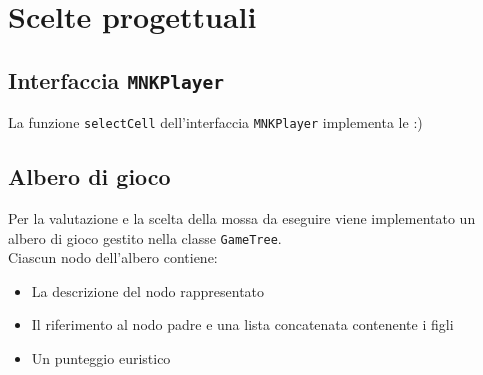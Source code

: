 \documentclass[11pt]{article}
\begin{document}
\section{Scelte progettuali}
\subsection{Interfaccia \texttt{MNKPlayer}}
La funzione \texttt{selectCell} dell'interfaccia \texttt{MNKPlayer} implementa le :)
\subsection{Albero di gioco}
Per la valutazione e la scelta della mossa da eseguire viene implementato un albero di gioco gestito nella classe \texttt{GameTree}.\\
Ciascun nodo dell'albero contiene:
\begin{itemize}		%
	\item La descrizione del nodo rappresentato
	\item Il riferimento al nodo padre e una lista concatenata contenente i figli
	\item Un punteggio euristico
\end{itemize}
\end{document}
